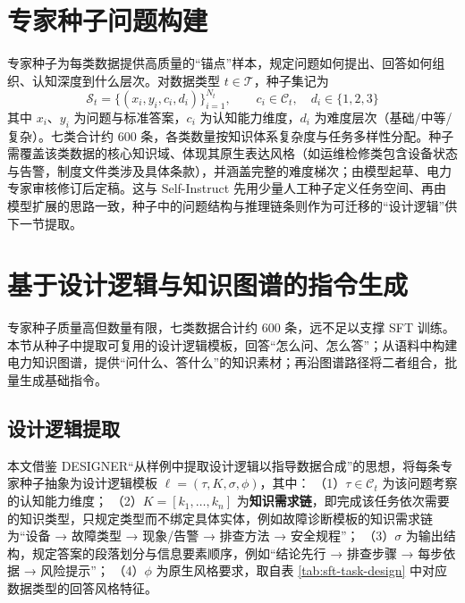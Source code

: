 \documentclass[fontset=fandol,type=master,campus=shenzhen,etitleauto=true]{hithesisbook}
\begin{document}
\section{专家种子问题构建}\label{ux4e13ux5bb6ux79cdux5b50ux95eeux9898ux6784ux5efa}

专家种子为每类数据提供高质量的“锚点”样本，规定问题如何提出、回答如何组织、认知深度到什么层次。对数据类型 $t \in \mathcal{T}$，种子集记为
\begin{equation}
\mathcal{S}_t = \{(x_i, y_i, c_i, d_i)\}_{i=1}^{N_t}, \qquad c_i \in \mathcal{C}_t, \quad d_i \in \{1, 2, 3\}
\end{equation}
其中 $x_i$、$y_i$ 为问题与标准答案，$c_i$ 为认知能力维度，$d_i$ 为难度层次（基础/中等/复杂）。七类合计约 600 条，各类数量按知识体系复杂度与任务多样性分配。种子需覆盖该类数据的核心知识域、体现其原生表达风格（如运维检修类包含设备状态与告警，制度文件类涉及具体条款），并涵盖完整的难度梯次；由模型起草、电力专家审核修订后定稿。这与 Self-Instruct 先用少量人工种子定义任务空间、再由模型扩展的思路一致\cite{ref24}，种子中的问题结构与推理链条则作为可迁移的“设计逻辑”\cite{ref54}供下一节提取。

\section{基于设计逻辑与知识图谱的指令生成}\label{ux57faux4e8eux8bbeux8ba1ux903bux8f91ux63d0ux53d6ux4e0eux77e5ux8bc6ux56feux8c31ux7684ux4efbux52a1ux6570ux636eux751fux6210}

专家种子质量高但数量有限，七类数据合计约 600 条，远不足以支撑 SFT 训练。本节从种子中提取可复用的设计逻辑模板，回答“怎么问、怎么答”；从语料中构建电力知识图谱，提供“问什么、答什么”的知识素材；再沿图谱路径将二者组合，批量生成基础指令。

\subsection{设计逻辑提取}\label{ux4eceux4e13ux5bb6ux79cdux5b50ux4e2dux63d0ux53d6ux8bbeux8ba1ux903bux8f91}

本文借鉴 DESIGNER“从样例中提取设计逻辑以指导数据合成”的思想\cite{ref54}，将每条专家种子抽象为设计逻辑模板 $\ell = (\tau, K, \sigma, \phi)$，其中：
（1）$\tau \in \mathcal{C}_t$ 为该问题考察的认知能力维度；
（2）$K = [k_1, \ldots, k_n]$ 为\textbf{知识需求链}，即完成该任务依次需要的知识类型，只规定类型而不绑定具体实体，例如故障诊断模板的知识需求链为“设备 → 故障类型 → 现象/告警 → 排查方法 → 安全规程”；
（3）$\sigma$ 为输出结构，规定答案的段落划分与信息要素顺序，例如“结论先行 → 排查步骤 → 每步依据 → 风险提示”；
（4）$\phi$ 为原生风格要求，取自表 \ref{tab:sft-task-design} 中对应数据类型的回答风格特征。
\end{document}
